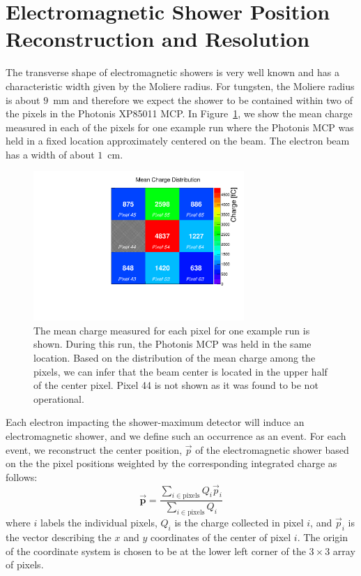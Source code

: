 \documentclass[12pt]{article}
\begin{document}
{\section{ Electromagnetic Shower Position Reconstruction and Resolution}
The transverse shape of electromagnetic showers is very well known and has a
characteristic width given by the Moliere radius. For tungsten, the Moliere
radius is about $9$~mm and therefore we expect the shower to be contained within
two of the pixels in the Photonis XP85011 MCP. In Figure~\ref{fig:exavint}, we
show the mean charge measured in each of the pixels for one example run where
the Photonis MCP was held in a fixed location approximately centered on the
beam. The electron beam has a width of about $1$~cm. 
\begin{figure}[htbp]
  \centering
  \includegraphics[width=8cm]{Images/exavint/exintrun30.pdf}
  \caption{\small The mean charge measured for each pixel for one example run is
    shown. During this run, the Photonis MCP was held in the same location. Based on
    the distribution of the mean charge among the pixels, we can infer that the beam
    center is located in the upper half of the center pixel. Pixel 44 is not shown
    as it was found to be not operational. }
  \label{fig:exavint}
\end{figure}
Each electron impacting the shower-maximum detector will induce an
electromagnetic shower, and we define such an occurrence as an event. For each 
event, we reconstruct the center position, $\vec{p}$ of the electromagnetic shower based on the 
the pixel positions weighted by the corresponding integrated charge as follows:
\begin{equation}
\vec{\mathbf{{p}}} = \frac{\sum_{i\in\mathrm{pixels}} Q_{i} \vec{p}_i}
{\sum_{i\in\mathrm{pixels}} Q_{i}}
\end{equation}
where $i$ labels the individual pixels, $Q_{i}$ is the charge collected in pixel 
$i$, and $\vec{p}_{i}$ is the vector describing the $x$ and $y$ coordinates of the center of
pixel $i$. The origin of the coordinate system is chosen to be at the lower left 
corner of the $3\times3$ array of pixels.

}
\end{document}

